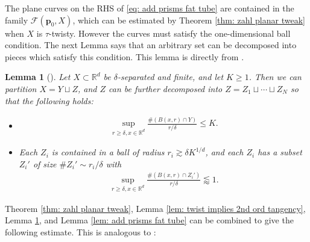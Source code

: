 \documentclass[12pt]{amsart}
\numberwithin{equation}{section}
\newtheorem{lemma}{Lemma}[section]
\newcommand{\R}{\mathbb{R}}
\newcommand{\1}{\mathbbm{1}}
\newcommand{\p}{\mathbf p}
\begin{document}
The plane curves on the RHS of \eqref{eq: add prisms fat tube} are contained in the family $\mathcal F(\p_0, X)$, which can be estimated by Theorem \ref{thm: zahl planar tweak} when $X$ is $\tau$-twisty. However the curves must satisfy the one-dimensional ball condition. The next Lemma says that an arbitrary set can be decomposed into pieces which satisfy this condition. This lemma is directly from \cite{KWZ}. 
\begin{lemma}[]\label{lem: 1 dim cond decomp}
    Let $X \subset \R^d$ be $\delta$-separated and finite, and let $K \geq 1$. Then we can partition $X = Y \sqcup Z$, and $Z$ can be further decomposed into $Z = Z_1 \sqcup \cdots \sqcup Z_N$ so that the following holds: 
    \begin{itemize}
        \item 
        \begin{align}
            \sup_{r \geq \delta, x \in \R^d} \frac{\#(B(x,r) \cap Y)}{r/\delta}\leq K. 
        \end{align}
        \item 
        Each $Z_i$ is contained in a ball of radius $r_i \gtrsim \delta K^{1/d}$, and each $Z_i$ has a subset $Z_i'$ of size $\# Z_i' \sim r_i /\delta$ with 
        \begin{align}
            \sup_{r \geq \delta, x \in \R^d} \frac{\#(B(x,r) \cap Z_i')}{r/\delta}\lessapprox 1. 
        \end{align}
    \end{itemize}    
\end{lemma}

Theorem \ref{thm: zahl planar tweak}, Lemma \ref{lem: twist implies 2nd ord tangency}, Lemma \ref{lem: 1 dim cond decomp}, and Lemma \ref{lem: add prisms fat tube} can be combined to give the following estimate. This is analogous to \cite[Proposition 3.3]{KWZ}:
\end{document}
